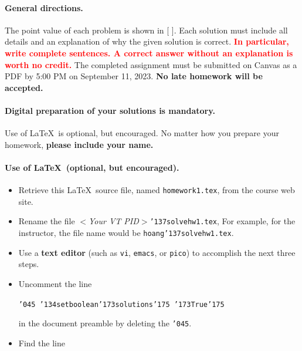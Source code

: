 \documentclass[11pt,twoside]{article}
\newcommand{\mybackslash}{\char'134}
\newcommand{\myleftbracket}{\char'173}
\newcommand{\myrightbracket}{\char'175}
\newcommand{\mypercent}{\char'045}
\newcommand{\myunderscore}{\char'137}
\newcommand{\duedate}{September 11, 2023}
\newcommand{\homeworknumber}{1}
\newcounter{problem}
\begin{document}
{
\begingroup %
\paragraph{General directions.}
The point value of each problem is shown in [ ].
Each solution must include all details and
an explanation of why the given solution is correct.
\textbf{\textcolor{red}{In particular,
write complete sentences.
A correct answer without an explanation is worth no credit.}}
The completed assignment must be submitted on Canvas as a PDF by 5:00 PM
on \duedate.
\textbf{No late homework will be accepted.}

\paragraph{Digital preparation of your solutions is mandatory.}
Use of \LaTeX\ is optional, but encouraged.
No matter how you prepare your homework,
\textbf{please include your name.}

\paragraph{Use of \LaTeX\ (optional, but encouraged).}
\begin{itemize}
\item Retrieve this \LaTeX\ source file,
named
\texttt{homework\homeworknumber.tex},
from the course web site.
\item Rename the file
\textit{$<$Your VT PID$>$}\texttt{{\myunderscore}solvehw\homeworknumber.tex},
For example,
for the instructor,
the file name would be
\texttt{hoang{\myunderscore}solvehw\homeworknumber.tex}.

\item
Use a \textbf{text editor}
(such as \texttt{vi}, \texttt{emacs}, or \texttt{pico})
to accomplish the next three steps.

\item
Uncomment the line

\texttt{{\mypercent} 
{\mybackslash}setboolean{\myleftbracket}solutions{\myrightbracket}%
{\myleftbracket}True{\myrightbracket}}

in the document preamble by deleting the \texttt{\mypercent}.

\item
Find the line


\end{itemize}}
\end{document}
